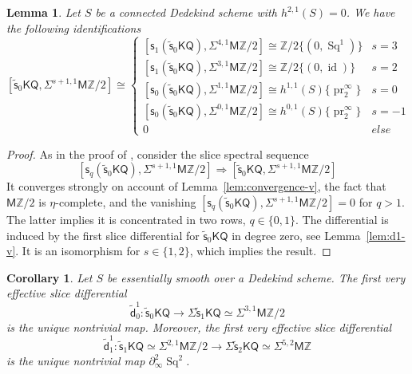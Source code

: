 \documentclass[11pt,hyp,english]{article}
\newcommand{\Z}{\mathbb{Z}}
\newcommand{\KQ}{\mathsf{KQ}}
\newcommand{\MZ}{\mathsf{M}\Z}
\newcommand{\HZ}{\mathsf{M}\Z}
\newcommand{\HWZ}{\mathsf{W}\Z}
\newcommand{\Sq}{\operatorname{Sq}}
\newcommand{\id}{\operatorname{id}}
\newcommand{\pr}{\operatorname{pr}}
\newcommand{\s}{\mathsf{s}}
\newcommand{\vs}{\tilde{\mathsf{s}}}
\newcommand{\vd}{{\tilde{\mathsf{d}}}}
\newtheorem{lemma}[theorem]{Lemma}
\newtheorem{corollary}[theorem]{Corollary}
\theoremstyle{definition}
\begin{document}


\begin{lemma}
\label{lem:vtomod2weight1}
Let $S$ be a connected Dedekind scheme with $h^{2,1}(S)=0$.
We have the following identifications
\[ [\vs_{0}\KQ ,\Sigma^{s+1,1}\MZ/2] \cong \begin{cases}
[\s_1(\vs_{0}\KQ ),\Sigma^{4,1}\MZ/2] \cong \Z/2\{(0,\Sq^1)\} & s=3 \\
[\s_1(\vs_{0}\KQ ),\Sigma^{3,1}\MZ/2] \cong \Z/2\{(0,\id)\} & s=2 \\
[\s_0(\vs_{0}\KQ ),\Sigma^{1,1}\MZ/2] \cong h^{1,1}(S)\{\pr^\infty_2\} & s=0 \\
[\s_0(\vs_{0}\KQ ),\Sigma^{0,1}\MZ/2] \cong h^{0,1}(S)\{\pr^\infty_2\} & s=-1 \\
0 & \mathit{else}
\end{cases}
\]
\end{lemma}
\begin{proof}
As in the proof of , consider the slice spectral sequence 
\[ 
[\s_{q}(\vs_{0}\KQ ),\Sigma^{s+1,1}\MZ/2] \Rightarrow [\vs_{0}\KQ ,\Sigma^{s+1,1}\MZ/2] 
\]
It converges strongly on account of Lemma~\ref{lem:convergence-v}, 
the fact that $\MZ/2$ is $\eta$-complete, 
and the vanishing $[\s_{q}(\vs_{0}\KQ ),\Sigma^{s+1,1}\MZ/2]=0$ for $q>1$. 
The latter implies it is concentrated in two rows, $q\in \{0,1\}$.
The differential is induced by the first slice differential for $\vs_{0}\KQ $ in degree zero, 
see Lemma~\ref{lem:d1-v}. 
It is an isomorphism for $s\in \{1,2\}$, which implies the result.
\end{proof}

\begin{corollary}\label{cor:vd-KQ}
Let $S$ be essentially smooth over a Dedekind scheme.
The first very effective slice differential
\[ \vd_0^1 \colon  \vs_0\KQ  \to \Sigma\vs_1\KQ \simeq\Sigma^{3,1}\MZ/2 \]
is the unique nontrivial map.
Moreover, 
the first very effective slice differential
\[ \vd_1^1 \colon \vs_1\KQ \simeq\Sigma^{2,1}\MZ/2 \to \Sigma\vs_2\KQ \simeq\Sigma^{5,2}\MZ\]
is the unique nontrivial map $\partial^2_\infty \Sq^2$.
\end{corollary}
\end{document}

